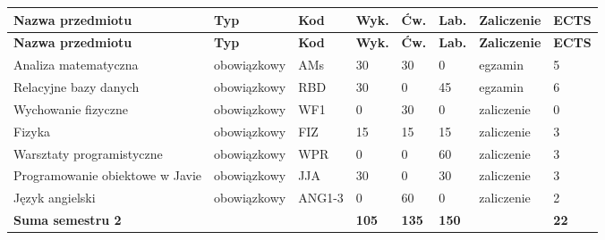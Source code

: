 \documentclass[12pt,a4paper]{article}
\newcommand{\thdrule}{\noalign{\global\setlength{\extrarowheight}{0pt}}}
\newcommand{\thdend}{\noalign{\global\setlength{\extrarowheight}{4pt}}}
\begin{document}
{\scriptsize
\begin{longtable}{>{\RaggedRight}m{5.0cm}m{1.9cm}m{0.75cm}m{0.85cm}m{0.85cm}m{0.85cm}m{1.45cm}m{0.9cm}}
\thdrule\toprule
\rowcolor{pjatkRed}
{\color{white}\footnotesize\textbf{\vphantom{Ag}Nazwa przedmiotu}} & {\color{white}\footnotesize\textbf{\vphantom{Ag}Typ}} & {\color{white}\footnotesize\textbf{\vphantom{Ag}Kod}} & {\color{white}\footnotesize\textbf{\vphantom{Ag}Wyk.}} & {\color{white}\footnotesize\textbf{\vphantom{Ag}Ćw.}} & {\color{white}\footnotesize\textbf{\vphantom{Ag}Lab.}} & {\color{white}\footnotesize\textbf{\vphantom{Ag}Zaliczenie}} & {\color{white}\footnotesize\textbf{\vphantom{Ag}ECTS}} \\
\midrule\thdend
\endfirsthead
\thdrule\toprule
\rowcolor{pjatkRed}
{\color{white}\footnotesize\textbf{\vphantom{Ag}Nazwa przedmiotu}} & {\color{white}\footnotesize\textbf{\vphantom{Ag}Typ}} & {\color{white}\footnotesize\textbf{\vphantom{Ag}Kod}} & {\color{white}\footnotesize\textbf{\vphantom{Ag}Wyk.}} & {\color{white}\footnotesize\textbf{\vphantom{Ag}Ćw.}} & {\color{white}\footnotesize\textbf{\vphantom{Ag}Lab.}} & {\color{white}\footnotesize\textbf{\vphantom{Ag}Zaliczenie}} & {\color{white}\footnotesize\textbf{\vphantom{Ag}ECTS}} \\
\midrule\thdend
\endhead
\rowcolor{tableRowLight} Analiza matematyczna & {\scriptsize obowiązkowy} & AMs & 30 & 30 & 0 & {\scriptsize egzamin} & 5 \\
\rowcolor{tableRowAlt} Relacyjne bazy danych & {\scriptsize obowiązkowy} & RBD & 30 & 0 & 45 & {\scriptsize egzamin} & 6 \\
\rowcolor{tableRowLight} Wychowanie fizyczne & {\scriptsize obowiązkowy} & WF1 & 0 & 30 & 0 & {\scriptsize zaliczenie} & 0 \\
\rowcolor{tableRowAlt} Fizyka & {\scriptsize obowiązkowy} & FIZ & 15 & 15 & 15 & {\scriptsize zaliczenie} & 3 \\
\rowcolor{tableRowLight} Warsztaty programistyczne & {\scriptsize obowiązkowy} & WPR & 0 & 0 & 60 & {\scriptsize zaliczenie} & 3 \\
\rowcolor{tableRowAlt} Programowanie obiektowe w Javie & {\scriptsize obowiązkowy} & JJA & 30 & 0 & 30 & {\scriptsize zaliczenie} & 3 \\
\rowcolor{tableRowLight} Język angielski & {\scriptsize obowiązkowy} & ANG1-3 & 0 & 60 & 0 & {\scriptsize zaliczenie} & 2 \\
\midrule[\heavyrulewidth]
\rowcolor{tableSummary} \textbf{Suma semestru 2} & & & \textbf{105} & \textbf{135} & \textbf{150} & & \textbf{22} \\
\bottomrule
\end{longtable}}
\end{document}
